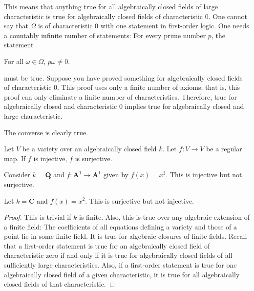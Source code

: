 \documentclass[11pt, oneside,margin=1in]{article}
\begin{document}
\begin{remark}
	This means that anything true for all algebraically closed fields of large characteristic is true for algebraically closed fields of characteristic $0$. One cannot say that $\Omega$ is of characteristic $0$ with one statement in first-order logic. One needs a countably infinite number of statements: For every prime number $p$, the statement
	\begin{center}
		\small For all $\omega\in \Omega$, $p\omega\ne 0$.
	\end{center}
	must be true. Suppose you have proved something for algebraically closed fields of characteristic $0$. This proof uses only a finite number of axioms; that is, this proof can only eliminate a finite number of characteristics. Therefore, true for algebraically closed and characteristic $0$ implies true for algebraically closed and large characteristic.

	The converse is clearly true.
\end{remark}

\begin{theorem}[Ax--Grothendieck]\label{}\text{}
Let $V$ be a variety over an algebraically closed field $k$. Let $f:V\longrightarrow V$ be a regular map. If $f$ is injective, $f$ is surjective.
\end{theorem}

\begin{example}\label{}\text{}
Consider $k= \mathbf{Q}$ and $f:\mathbf{A}^1\longrightarrow \mathbf{A}^1$ given by $f(x)=x^ 3$. This is injective but not surjective.
\end{example}

\begin{example}\label{}\text{}
Let $k=\mathbf{C}$ and $f(x)=x^2$. This is surjective but not injective.
\end{example}

\begin{proof}
This is trivial if $k$ is finite. Also, this is true over any algebraic extension of a finite field: The coefficients of all equations defining a variety and those of a point lie in some finite field. It is true for algebraic closures of finite fields. Recall that a first-order statement is true for an algebraically closed field of characteristic zero if and only if it is true for algebraically closed fields of all sufficiently large characteristics. Also, if a first-order statement is true for one algebraically closed field of a given characteristic, it is true for all algebraically closed fields of that characteristic.
\end{proof}
\end{document}
